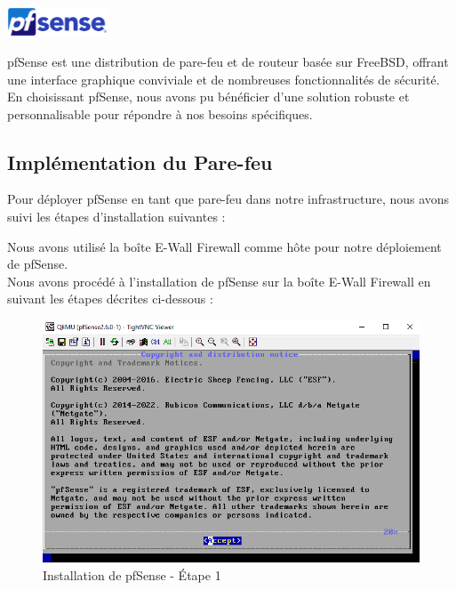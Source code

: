 \begin{center}
\includegraphics[width=3cm]{Images/Logo-pfsense.png}
\end{center}


pfSense est une distribution de pare-feu et de routeur basée sur FreeBSD, offrant une interface graphique conviviale et de nombreuses fonctionnalités de sécurité. En choisissant pfSense, nous avons pu bénéficier d'une solution robuste et personnalisable pour répondre à nos besoins spécifiques.

\subsection{Implémentation du Pare-feu}

Pour déployer pfSense en tant que pare-feu dans notre infrastructure, nous avons suivi les étapes d'installation suivantes :

Nous avons utilisé la boîte E-Wall Firewall comme hôte pour notre déploiement de pfSense. \\


Nous avons procédé à l'installation de pfSense sur la boîte E-Wall Firewall en suivant les étapes décrites ci-dessous : \\

\begin{figure}[H]
\centering
\includegraphics[width=15cm]{Images/BRadesMelian-Topologie2.png}
\caption{Installation de pfSense - Étape 1}
\label{Chap3.3.2}
\end{figure}

